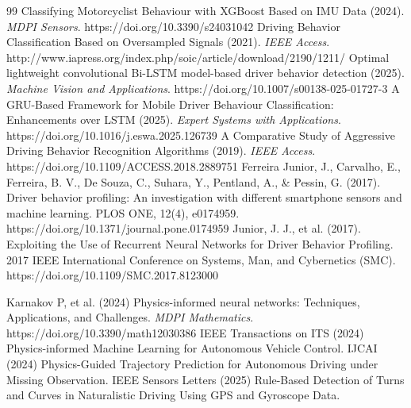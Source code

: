 \documentclass[pdflatex,sn-mathphys-num]{sn-jnl}
\theoremstyle{thmstyleone}
\theoremstyle{thmstyletwo}
\theoremstyle{thmstylethree}
\begin{document}
\begin{thebibliography}{99}
 Classifying Motorcyclist Behaviour with XGBoost Based on IMU Data (2024). \textit{MDPI Sensors}. https://doi.org/10.3390/s24031042
 Driving Behavior Classification Based on Oversampled Signals (2021). \textit{IEEE Access}. http://www.iapress.org/index.php/soic/article/download/2190/1211/
 Optimal lightweight convolutional Bi-LSTM model-based driver behavior detection (2025). \textit{Machine Vision and Applications}. https://doi.org/10.1007/s00138-025-01727-3
 A GRU-Based Framework for Mobile Driver Behaviour Classification: Enhancements over LSTM (2025). \textit{Expert Systems with Applications}. https://doi.org/10.1016/j.eswa.2025.126739
 A Comparative Study of Aggressive Driving Behavior Recognition Algorithms (2019). \textit{IEEE Access}. https://doi.org/10.1109/ACCESS.2018.2889751
 Ferreira Junior, J., Carvalho, E., Ferreira, B. V., De Souza, C., Suhara, Y., Pentland, A., \& Pessin, G. (2017). Driver behavior profiling: An investigation with different smartphone sensors and machine learning. PLOS ONE, 12(4), e0174959. https://doi.org/10.1371/journal.pone.0174959
 Junior, J. J., et al. (2017). Exploiting the Use of Recurrent Neural Networks for Driver Behavior Profiling. 2017 IEEE International Conference on Systems, Man, and Cybernetics (SMC). https://doi.org/10.1109/SMC.2017.8123000

 Karnakov P, et al. (2024) Physics-informed neural networks: Techniques, Applications, and Challenges. \textit{MDPI Mathematics}. https://doi.org/10.3390/math12030386
 IEEE Transactions on ITS (2024) Physics-informed Machine Learning for Autonomous Vehicle Control.
 IJCAI (2024) Physics-Guided Trajectory Prediction for Autonomous Driving under Missing Observation.
 IEEE Sensors Letters (2025) Rule-Based Detection of Turns and Curves in Naturalistic Driving Using GPS and Gyroscope Data.


\end{thebibliography}
\end{document}
